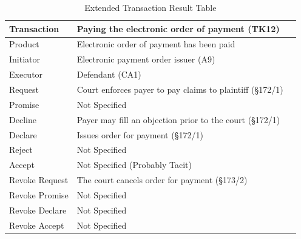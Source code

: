 \begin{landscape}
\begin{table}[h]
\caption{Extended Transaction Result Table}
\label{tab:etrt}
\begin{tabular}{|l||l|l|}
\hline
Transaction  &  Paying the electronic order of payment (TK12) \\ \hline
Product      &  Electronic order of payment has been paid \\ \hline
Initiator      &  Electronic payment order issuer (A9) \\ \hline
Executor       &  Defendant (CA1) \\ \hline
Request        &    Court enforces payer to pay claims to plaintiff (\S172/1)
  \\ \hline
Promise        &    Not Specified   \\ \hline
Decline        &  Payer may fill an objection prior to the court (\S172/1)  \\ \hline
Declare        &  Issues order for payment (\S172/1)  \\ \hline
Reject         &  Not Specified   \\ \hline
Accept         & Not Specified (Probably Tacit) \\ \hline
Revoke Request & The court cancels order for payment (\S173/2)       \\ \hline
Revoke Promise & Not Specified  \\ \hline
Revoke Declare & Not Specified      \\ \hline
Revoke Accept  &  Not Specified \\ \hline
\end{tabular}
\end{table}


\end{landscape}
